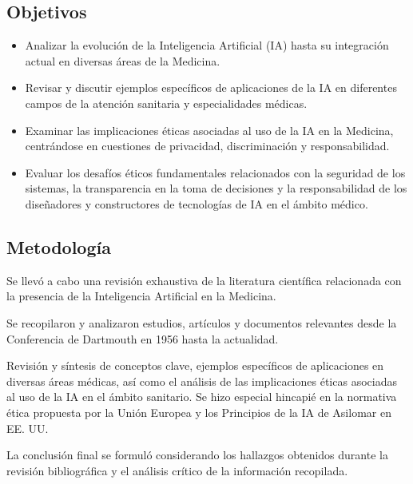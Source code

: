 \documentclass[10pt]{article}
\begin{document}
\newpage %
\vspace{0.5cm}
\begin{center}
    \section{Objetivos}
\end{center}
\begin{itemize}
  \item Analizar la evolución de la Inteligencia Artificial (IA) hasta su integración actual en diversas áreas de la Medicina.
  \item Revisar y discutir ejemplos específicos de aplicaciones de la IA en diferentes campos de la atención sanitaria y especialidades médicas.
  \item Examinar las implicaciones éticas asociadas al uso de la IA en la Medicina, centrándose en cuestiones de privacidad, discriminación y responsabilidad.
  \item Evaluar los desafíos éticos fundamentales relacionados con la seguridad de los sistemas, la transparencia en la toma de decisiones y la responsabilidad de los diseñadores y constructores de tecnologías de IA en el ámbito médico.
  \end{itemize}

 
\vspace{0.5cm}
\begin{center}
    \section{Metodología}
\end{center}


Se llevó a cabo una revisión exhaustiva de la literatura científica relacionada con la presencia de la Inteligencia Artificial en la Medicina. 


Se recopilaron y analizaron estudios, artículos y documentos relevantes desde la Conferencia de Dartmouth en 1956 hasta la actualidad. 


Revisión y síntesis de conceptos clave, ejemplos específicos de aplicaciones en diversas áreas médicas, así como el análisis de las implicaciones éticas asociadas al uso de la IA en el ámbito sanitario. Se hizo especial hincapié en la normativa ética propuesta por la Unión Europea y los Principios de la IA de Asilomar en EE. UU. 


La conclusión final se formuló considerando los hallazgos obtenidos durante la revisión bibliográfica y el análisis crítico de la información recopilada.
\end{document}
